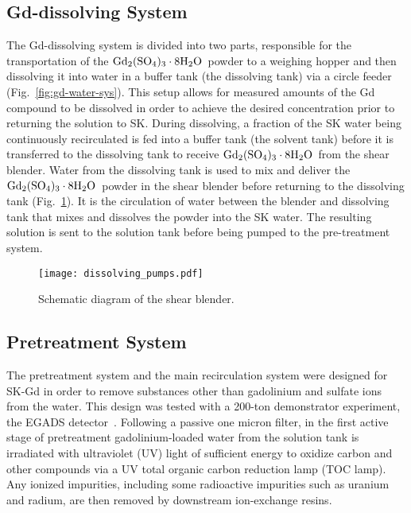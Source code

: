 \documentclass[preprint,12pt]{elsarticle}
\newcommand{\GdSOw}{$\rm Gd_2(\rm SO_4)_3\cdot \rm 8H_2O$\ }
\begin{document}
\subsection{Gd-dissolving System}

The Gd-dissolving system is divided into two parts, responsible for the transportation of the \GdSOw powder to a weighing hopper and then dissolving it into water in a buffer tank (the dissolving tank) via a circle feeder (Fig.~\ref{fig:gd-water-sys}). 
This setup allows for measured amounts of the Gd compound to be dissolved in order to achieve the desired concentration prior to returning the solution to SK.
During dissolving, a fraction of the SK water being continuously recirculated is fed into a buffer tank (the solvent tank) before it is transferred to the dissolving tank to receive \GdSOw from the shear blender.
Water from the dissolving tank is used to mix and deliver the \GdSOw powder in the shear blender before returning to the dissolving tank (Fig.~\ref{fig:dissolving}).
It is the circulation of water between the blender and dissolving tank that mixes and dissolves the powder into the SK water. 
The resulting solution is sent to the solution tank before being pumped to the pre-treatment system.



\begin{figure}[htb]
\centering\texttt{[image: dissolving\_pumps.pdf]}
\caption{Schematic diagram of the shear blender.}
\label{fig:dissolving}
\end{figure}

\subsection{Pretreatment System}\label{sec_pretreatment}
The pretreatment system and the main recirculation system were designed for SK-Gd in order to remove substances other than gadolinium and sulfate ions from the water. 
This design was tested with a 200-ton demonstrator experiment, the EGADS detector~\cite{egads:2020}.
Following a passive one micron filter, in the first active stage of pretreatment  gadolinium-loaded water from the solution tank is irradiated with ultraviolet (UV) light of sufficient energy to oxidize carbon and other compounds via a UV total organic carbon reduction lamp (TOC lamp).
Any ionized impurities, including some radioactive impurities such as uranium and radium, are then removed by downstream ion-exchange resins.
\end{document}
